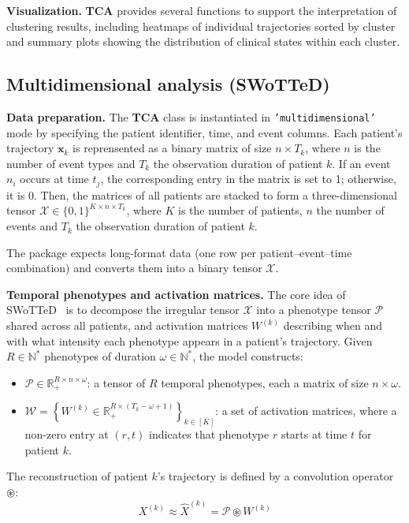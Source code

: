 \documentclass[pdflatex,sn-mathphys-num,referee,lineno]{sn-jnl}
\newcommand{\code}[1]{\texttt{#1}}
\newcommand{\pkg}[1]{\textbf{#1}}
\begin{document}
\textbf{Visualization.}
\pkg{TCA} provides several functions to support the interpretation of clustering results, including heatmaps of individual trajectories sorted by cluster and summary plots showing the distribution of clinical states within each cluster.

\subsection{Multidimensional analysis (SWoTTeD)}\label{sec:multi}

\textbf{Data preparation.}
The \pkg{TCA} class is instantiated in \code{'multidimensional'} mode by specifying the patient identifier, time, and event columns.
Each patient's trajectory $\boldsymbol{x}_k$ is reprensented as a binary matrix of size $n \times T_k$, where $n$ is the number of event types and $T_k$ the observation duration of patient $k$. If an event $n_i$ occurs at time $t_j$, the corresponding entry in the matrix is set to 1; otherwise, it is 0.
Then, the matrices of all patients are stacked to form a three-dimensional tensor $\mathcal{X} \in \{0,1\}^{K \times n \times T_k}$, where $K$ is the number of patients, $n$ the number of events and $T_k$ the observation duration of patient $k$.

The package expects long-format data (one row per patient–event–time combination) and converts them into a binary tensor $\mathcal{X}$.

\textbf{Temporal phenotypes and activation matrices.}
The core idea of SWoTTeD~\cite{sebia2024swotted} is to decompose the irregular tensor $\mathcal{X}$ into a phenotype tensor $\mathcal{P}$ shared across all patients, and activation matrices $W^{(k)}$ describing when and with what intensity each phenotype appears in a patient's trajectory.
Given $R \in \mathbb{N}^*$ phenotypes of duration $\omega \in \mathbb{N}^*$, the model constructs:
\begin{itemize}
  \item $\mathcal{P} \in \mathbb{R}_+^{R \times n \times \omega}$: a tensor of $R$ temporal phenotypes, each a matrix of size $n \times \omega$.
  \item $\mathcal{W} = \left\{W^{(k)} \in \mathbb{R}_+^{R \times (T_k - \omega + 1)}\right\}_{k \in [K]}$: a set of activation matrices, where a non-zero entry at $(r,t)$ indicates that phenotype $r$ starts at time $t$ for patient $k$.
\end{itemize}

The reconstruction of patient $k$'s trajectory is defined by a convolution operator $\circledast$:
\begin{equation}
  X^{(k)} \approx \widehat{X}^{(k)} = \mathcal{P} \circledast W^{(k)}
  \label{eq:x_eq}
\end{equation}
\end{document}
